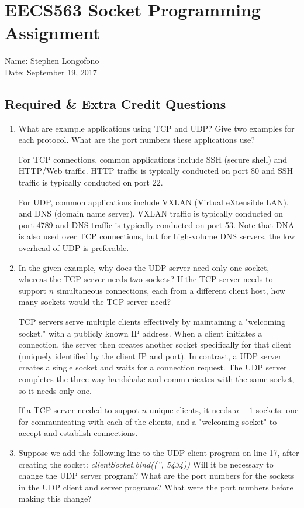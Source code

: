 \documentclass{article}
\begin{document}
\section*{EECS563 Socket Programming Assignment}
Name: Stephen Longofono
\\Date: September 19, 2017

\subsection*{Required \& Extra Credit Questions}
\begin{enumerate}
    \item What are example applications using TCP and UDP?  Give two examples for each protocol.  What are the port numbers these applications use?

    For TCP connections, common applications include SSH (secure shell) and HTTP/Web traffic.  HTTP traffic is typically conducted on port 80 and SSH traffic is typically conducted on port 22.
    
    For UDP, common applications include VXLAN (Virtual eXtensible LAN), and DNS (domain name server).  VXLAN traffic is typically conducted on port 4789 and DNS traffic is typically conducted on port 53.  Note that DNA is also used over TCP connections, but for high-volume DNS servers, the low overhead of UDP is preferable.

    \item In the given example, why does the UDP server need only one socket, whereas the TCP server needs two sockets?  If the TCP server needs to support $n$ simultaneous connections, each from a different client host, how many sockets would the TCP server need?
    
    TCP servers serve multiple clients effectively by maintaining a "welcoming socket," with a publicly known IP address.  When a client initiates a connection, the server then creates another socket specifically for that client (uniquely identified by the client IP and port).  In contrast, a UDP server creates a single socket and waits for a connection request.  The UDP server completes the three-way handshake and communicates with the same socket, so it needs only one.
    
    If a TCP server needed to suppot $n$ unique clients, it needs $n+1$ sockets: one for communicating with each of the clients, and a "welcoming socket" to accept and establish connections.
    
    \item Suppose we add the following line to the UDP client program on line 17, after creating the socket: {\emph{clientSocket.bind(('', 5434))}}
    Will it be necessary to change the UDP server program?  What are the port numbers for the sockets in the UDP client and server programs?  What were the port numbers before making this change?
    

\end{enumerate}
\end{document}
